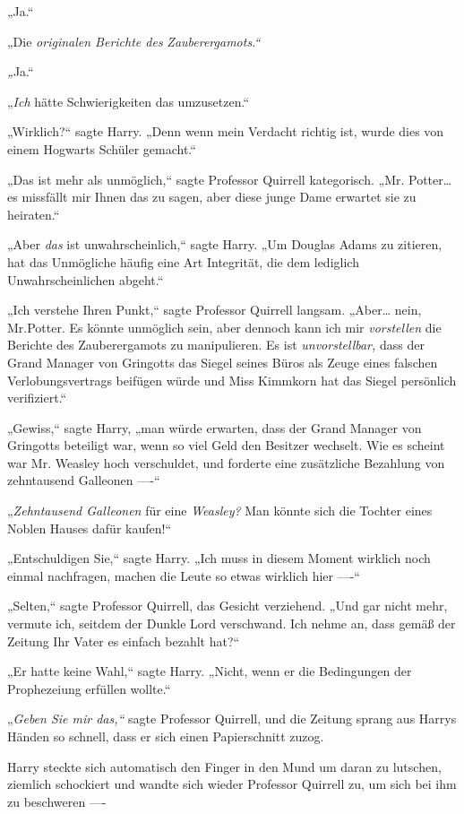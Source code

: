 {„Ja.“

„Die \emph{originalen Berichte des} \emph{Zauberergamots.“}

\emph{„}Ja.“

„\emph{Ich} hätte Schwierigkeiten das umzusetzen.“

„Wirklich?“ sagte Harry. „Denn wenn mein Verdacht richtig ist, wurde dies von einem Hogwarts Schüler gemacht.“

„Das ist mehr als unmöglich,“ sagte Professor Quirrell kategorisch. „Mr. Potter… es missfällt mir Ihnen das zu sagen, aber diese junge Dame erwartet sie zu heiraten.“

„Aber \emph{das} ist unwahrscheinlich,“ sagte Harry. „Um Douglas Adams zu zitieren, hat das Unmögliche häufig eine Art Integrität, die dem lediglich Unwahrscheinlichen abgeht.“

„Ich verstehe Ihren Punkt,“ sagte Professor Quirrell langsam. „Aber… nein, Mr.Potter. Es könnte unmöglich sein, aber dennoch kann ich mir \emph{vorstellen} die Berichte des Zauberergamots zu manipulieren. Es ist \emph{unvorstellbar,} dass der Grand Manager von Gringotts das Siegel seines Büros als Zeuge eines falschen Verlobungsvertrags beifügen würde und Miss Kimmkorn hat das Siegel persönlich verifiziert.“

„Gewiss,“ sagte Harry, „man würde erwarten, dass der Grand Manager von Gringotts beteiligt war, wenn so viel Geld den Besitzer wechselt. Wie es scheint war Mr. Weasley hoch verschuldet, und forderte eine zusätzliche Bezahlung von zehntausend Galleonen ----“

„\emph{Zehntausend Galleonen} für eine \emph{Weasley?} Man könnte sich die Tochter eines Noblen Hauses dafür kaufen!“

„Entschuldigen Sie,“ sagte Harry. „Ich muss in diesem Moment wirklich noch einmal nachfragen, machen die Leute so etwas wirklich hier ----“

„Selten,“ sagte Professor Quirrell, das Gesicht verziehend. „Und gar nicht mehr, vermute ich, seitdem der Dunkle Lord verschwand. Ich nehme an, dass gemäß der Zeitung Ihr Vater es einfach bezahlt hat?“

„Er hatte keine Wahl,“ sagte Harry. „Nicht, wenn er die Bedingungen der Prophezeiung erfüllen wollte.“

„\emph{Geben Sie mir das,“} sagte Professor Quirrell, und die Zeitung sprang aus Harrys Händen so schnell, dass er sich einen Papierschnitt zuzog.

Harry steckte sich automatisch den Finger in den Mund um daran zu lutschen, ziemlich schockiert und wandte sich wieder Professor Quirrell zu, um sich bei ihm zu beschweren ----

}
